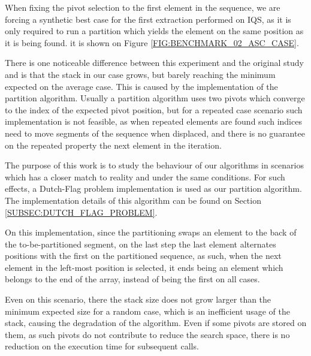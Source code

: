 When fixing the pivot selection to the first element in the sequence, we are forcing a synthetic best case for the first extraction performed on IQS, as it is only required to run a partition which yields the element on the same position as it is being found. it is shown on Figure \ref{FIG:BENCHMARK_02_ASC_CASE}. 

There is one noticeable difference between this experiment and the original study and is that the stack in our case grows, but barely reaching the minimum expected on the average case. This is caused by the implementation of the partition algorithm. Usually a partition algorithm uses two pivots which converge to the index of the expected pivot position, but for a repeated case scenario such implementation is not feasible, as when repeated elements are found such indices need to move segments of the sequence when displaced, and there is no guarantee on the repeated property the next element in the iteration.

The purpose of this work is to study the behaviour of our algorithms in scenarios which has a closer match to reality and under the same conditions. For such effects, a Dutch-Flag problem implementation is used as our partition algorithm. The implementation details of this algorithm can be found on Section \ref{SUBSEC:DUTCH_FLAG_PROBLEM}.

On this implementation, since the partitioning swaps an element to the back of the to-be-partitioned segment, on the last step the last element alternates positions with the first on the partitioned sequence, as such, when the next element in the left-most position is selected, it ends being an element which belongs to the end of the array, instead of being the first on all cases.

Even on this scenario, there the stack size does not grow larger than the minimum expected size for a random case, which is an inefficient usage of the stack, causing the degradation of the algorithm. Even if some pivots are stored on them, as such pivots do not contribute to reduce the search space, there is no reduction on the execution time for subsequent calls.

